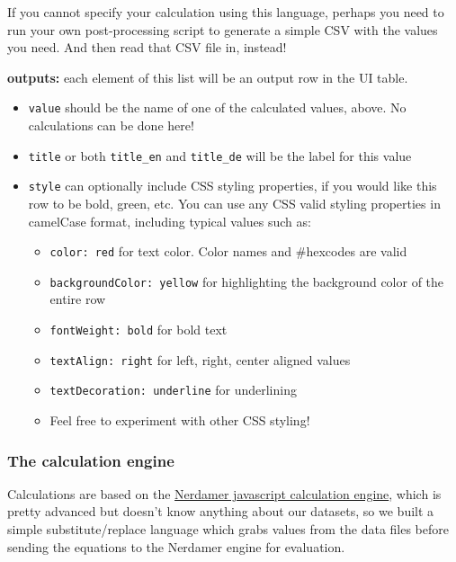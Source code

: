 If you cannot specify your calculation using this language, perhaps you
need to run your own post-processing script to generate a simple CSV
with the values you need. And then read that CSV file in, instead!

\textbf{outputs:} each element of this list will be an output row in the
UI table.

\begin{itemize}
\tightlist
\item
  \texttt{value} should be the name of one of the calculated values,
  above. No calculations can be done here!
\item
  \texttt{title} or both \texttt{title\_en} and \texttt{title\_de} will
  be the label for this value
\item
  \texttt{style} can optionally include CSS styling properties, if you
  would like this row to be bold, green, etc. You can use any CSS valid
  styling properties in camelCase format, including typical values such
  as:

  \begin{itemize}
  \tightlist
  \item
    \texttt{color:\ red} for text color. Color names and \#hexcodes are
    valid
  \item
    \texttt{backgroundColor:\ yellow} for highlighting the background
    color of the entire row
  \item
    \texttt{fontWeight:\ bold} for bold text
  \item
    \texttt{textAlign:\ right} for left, right, center aligned values
  \item
    \texttt{textDecoration:\ underline} for underlining
  \item
    Feel free to experiment with other CSS styling!
  \end{itemize}
\end{itemize}

\hypertarget{the-calculation-engine}{%
\subsubsection{The calculation engine}\label{the-calculation-engine}}

Calculations are based on the \href{https://nerdamer.com/}{Nerdamer
javascript calculation engine}, which is pretty advanced but doesn't
know anything about our datasets, so we built a simple
substitute/replace language which grabs values from the data files
before sending the equations to the Nerdamer engine for evaluation.

